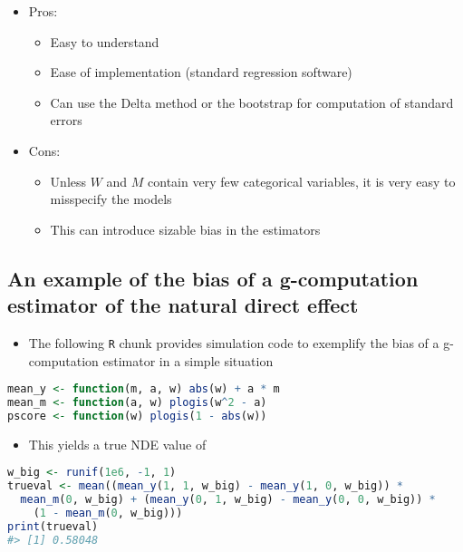 \documentclass[
  12pt,
]{book}
\newcommand{\passthrough}[1]{#1}
\providecommand{\tightlist}{%
  \setlength{\itemsep}{0pt}\setlength{\parskip}{0pt}}
\theoremstyle{definition}
\theoremstyle{definition}
\theoremstyle{definition}
\newcommand{\1}{\mathbbm{1}}
\begin{document}
\begin{itemize}
\tightlist
\item
  Pros:

  \begin{itemize}
  \tightlist
  \item
    Easy to understand
  \item
    Ease of implementation (standard regression software)
  \item
    Can use the Delta method or the bootstrap for computation of standard errors
  \end{itemize}
\item
  Cons:

  \begin{itemize}
  \tightlist
  \item
    Unless \(W\) and \(M\) contain very few categorical variables, it is very easy
    to misspecify the models
  \item
    This can introduce sizable bias in the estimators
  \end{itemize}
\end{itemize}

\hypertarget{an-example-of-the-bias-of-a-g-computation-estimator-of-the-natural-direct-effect}{%
\subsection{An example of the bias of a g-computation estimator of the natural direct effect}\label{an-example-of-the-bias-of-a-g-computation-estimator-of-the-natural-direct-effect}}

\begin{itemize}
\tightlist
\item
  The following \passthrough{\lstinline!R!} chunk provides simulation code to exemplify the bias of a
  g-computation estimator in a simple situation
\end{itemize}

\begin{lstlisting}[language=R]
mean_y <- function(m, a, w) abs(w) + a * m
mean_m <- function(a, w) plogis(w^2 - a)
pscore <- function(w) plogis(1 - abs(w))
\end{lstlisting}

\begin{itemize}
\tightlist
\item
  This yields a true NDE value of
\end{itemize}

\begin{lstlisting}[language=R]
w_big <- runif(1e6, -1, 1)
trueval <- mean((mean_y(1, 1, w_big) - mean_y(1, 0, w_big)) *
  mean_m(0, w_big) + (mean_y(0, 1, w_big) - mean_y(0, 0, w_big)) *
    (1 - mean_m(0, w_big)))
print(trueval)
#> [1] 0.58048
\end{lstlisting}
\end{document}
